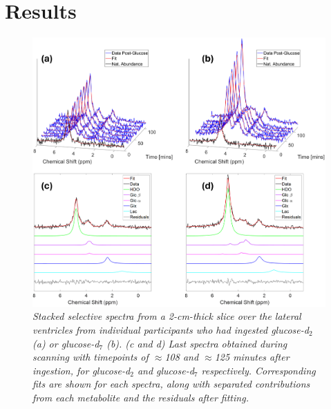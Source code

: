\section{Results}

\begin{figure}
    \centering
    \includegraphics[width = 1\textwidth]{Figures/Glucose/Selective.png}
    \caption{\textit{Stacked selective spectra from a 2-cm-thick slice over the lateral ventricles from individual participants who had ingested glucose-d$_2$ (a) or glucose-d$_7$ (b). (c and d) Last spectra obtained during scanning with timepoints of $\approx$108 and $\approx$125 minutes after ingestion, for glucose-d$_2$ and glucose-d$_7$ respectively. Corresponding fits are shown for each spectra, along with separated contributions from each metabolite and the residuals after fitting.}}
    \label{fig:Glu:Select}
\end{figure}

